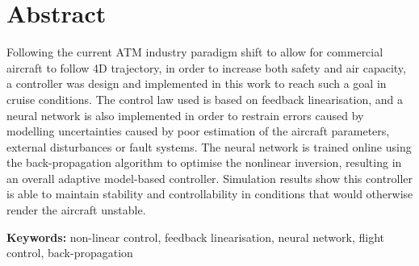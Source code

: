 
\section*{Abstract}


Following the current ATM industry paradigm shift to allow for commercial aircraft to follow 4D trajectory, in order to increase both safety and air capacity, a controller was design and implemented in this work to reach such a goal in cruise conditions. The control law used is based on feedback linearisation, and a neural network is also implemented in order to restrain errors caused by modelling uncertainties caused by poor estimation of the aircraft parameters, external disturbances or fault systems. The neural network is trained online using the back-propagation algorithm to optimise the nonlinear inversion, resulting in an overall adaptive model-based controller. Simulation results show this controller is able to maintain stability and controllability in conditions that would otherwise render the aircraft unstable.

\vfill

\textbf{\Large Keywords:} non-linear control, feedback linearisation, neural network, flight control, back-propagation

